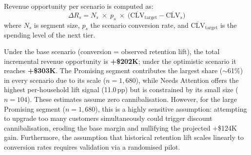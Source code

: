 \documentclass[conference]{IEEEtran}
\begin{document}
Revenue opportunity per scenario is computed as:
\[
  \Delta R_s = N_s \;\times\; p_s \;\times\;
  \bigl(\overline{\text{CLV}}_{\text{target}} -
        \overline{\text{CLV}}_s\bigr)
\]
where $N_s$ is segment size, $p_s$ the scenario conversion rate,
and $\overline{\text{CLV}}_{\text{target}}$ is the spending level
of the next tier.

\begin{table}[H]
\centering
\caption{Revenue opportunity under three conversion scenarios
         (conversion rates derived from quasi-experiment retention lift).}
\label{tab:scenarios}
\end{table}

Under the base scenario (conversion = observed retention lift), the
total incremental revenue opportunity is \textbf{+\$202K}; under the
optimistic scenario it reaches \textbf{+\$303K}.  The Promising
segment contributes the largest share ($\sim$61\%) in every scenario
due to its scale ($n = 1{,}680$), while Needs Attention offers the
highest per-household lift signal (11.0\,pp) but is constrained
by its small size ($n = 104$). These estimates assume zero cannibalisation.
However, for the large Promising segment ($n=1{,}680$), this is a highly sensitive assumption: attempting to upgrade too many customers simultaneously could trigger discount cannibalisation, eroding the base margin and nullifying the projected +\$124K gain. Furthermore, the assumption that historical retention lift scales linearly to conversion rates requires validation via a randomised pilot.
\end{document}
